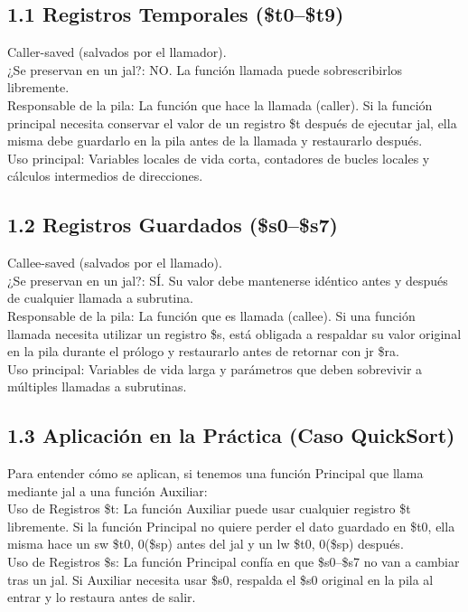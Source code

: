 \documentclass[12pt,a4paper]{article}
\begin{document}
\subsection*{1.1 Registros Temporales (\$t0--\$t9)}
Caller-saved (salvados por el llamador).\\
¿Se preservan en un jal?: NO. La función llamada puede sobrescribirlos libremente.\\
Responsable de la pila: La función que hace la llamada (caller). Si la función principal necesita conservar el valor de un registro \$t después de ejecutar jal, ella misma debe guardarlo en la pila antes de la llamada y restaurarlo después.\\
Uso principal: Variables locales de vida corta, contadores de bucles locales y cálculos intermedios de direcciones.

\subsection*{1.2 Registros Guardados (\$s0--\$s7)}
Callee-saved (salvados por el llamado).\\
¿Se preservan en un jal?: SÍ. Su valor debe mantenerse idéntico antes y después de cualquier llamada a subrutina.\\
Responsable de la pila: La función que es llamada (callee). Si una función llamada necesita utilizar un registro \$s, está obligada a respaldar su valor original en la pila durante el prólogo y restaurarlo antes de retornar con jr \$ra.\\
Uso principal: Variables de vida larga y parámetros que deben sobrevivir a múltiples llamadas a subrutinas.

\subsection*{1.3 Aplicación en la Práctica (Caso QuickSort)}
Para entender cómo se aplican, si tenemos una función Principal que llama mediante jal a una función Auxiliar:\\
Uso de Registros \$t: La función Auxiliar puede usar cualquier registro \$t libremente. Si la función Principal no quiere perder el dato guardado en \$t0, ella misma hace un sw \$t0, 0(\$sp) antes del jal y un lw \$t0, 0(\$sp) después.\\
Uso de Registros \$s: La función Principal confía en que \$s0--\$s7 no van a cambiar tras un jal. Si Auxiliar necesita usar \$s0, respalda el \$s0 original en la pila al entrar y lo restaura antes de salir.
\end{document}
